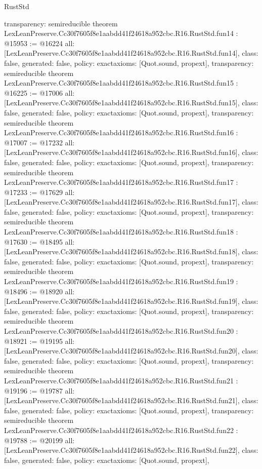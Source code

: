 \begin{lexlean}{RustStd}
\begin{coremodule}
{  transparency: semireducible
}
theorem LexLeanPreserve.Cc30f7605f8e1aabdd41f24618a952cbc.R16.RustStd.fun14 : @15953 := @16224 {
  all: [LexLeanPreserve.Cc30f7605f8e1aabdd41f24618a952cbc.R16.RustStd.fun14],
  class: false,
  generated: false,
  policy: exact{axioms: [Quot.sound, propext]},
  transparency: semireducible
}
theorem LexLeanPreserve.Cc30f7605f8e1aabdd41f24618a952cbc.R16.RustStd.fun15 : @16225 := @17006 {
  all: [LexLeanPreserve.Cc30f7605f8e1aabdd41f24618a952cbc.R16.RustStd.fun15],
  class: false,
  generated: false,
  policy: exact{axioms: [Quot.sound, propext]},
  transparency: semireducible
}
theorem LexLeanPreserve.Cc30f7605f8e1aabdd41f24618a952cbc.R16.RustStd.fun16 : @17007 := @17232 {
  all: [LexLeanPreserve.Cc30f7605f8e1aabdd41f24618a952cbc.R16.RustStd.fun16],
  class: false,
  generated: false,
  policy: exact{axioms: [Quot.sound, propext]},
  transparency: semireducible
}
theorem LexLeanPreserve.Cc30f7605f8e1aabdd41f24618a952cbc.R16.RustStd.fun17 : @17233 := @17629 {
  all: [LexLeanPreserve.Cc30f7605f8e1aabdd41f24618a952cbc.R16.RustStd.fun17],
  class: false,
  generated: false,
  policy: exact{axioms: [Quot.sound, propext]},
  transparency: semireducible
}
theorem LexLeanPreserve.Cc30f7605f8e1aabdd41f24618a952cbc.R16.RustStd.fun18 : @17630 := @18495 {
  all: [LexLeanPreserve.Cc30f7605f8e1aabdd41f24618a952cbc.R16.RustStd.fun18],
  class: false,
  generated: false,
  policy: exact{axioms: [Quot.sound, propext]},
  transparency: semireducible
}
theorem LexLeanPreserve.Cc30f7605f8e1aabdd41f24618a952cbc.R16.RustStd.fun19 : @18496 := @18920 {
  all: [LexLeanPreserve.Cc30f7605f8e1aabdd41f24618a952cbc.R16.RustStd.fun19],
  class: false,
  generated: false,
  policy: exact{axioms: [Quot.sound, propext]},
  transparency: semireducible
}
theorem LexLeanPreserve.Cc30f7605f8e1aabdd41f24618a952cbc.R16.RustStd.fun20 : @18921 := @19195 {
  all: [LexLeanPreserve.Cc30f7605f8e1aabdd41f24618a952cbc.R16.RustStd.fun20],
  class: false,
  generated: false,
  policy: exact{axioms: [Quot.sound, propext]},
  transparency: semireducible
}
theorem LexLeanPreserve.Cc30f7605f8e1aabdd41f24618a952cbc.R16.RustStd.fun21 : @19196 := @19787 {
  all: [LexLeanPreserve.Cc30f7605f8e1aabdd41f24618a952cbc.R16.RustStd.fun21],
  class: false,
  generated: false,
  policy: exact{axioms: [Quot.sound, propext]},
  transparency: semireducible
}
theorem LexLeanPreserve.Cc30f7605f8e1aabdd41f24618a952cbc.R16.RustStd.fun22 : @19788 := @20199 {
  all: [LexLeanPreserve.Cc30f7605f8e1aabdd41f24618a952cbc.R16.RustStd.fun22],
  class: false,
  generated: false,
  policy: exact{axioms: [Quot.sound, propext]},
}
\end{coremodule}
\end{lexlean}
